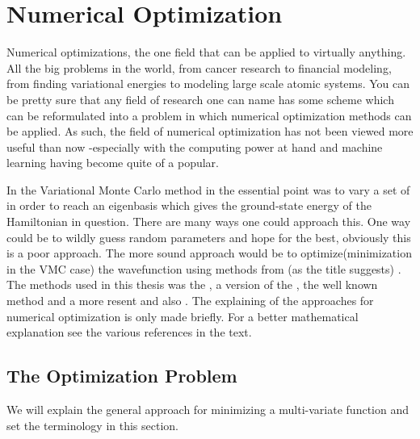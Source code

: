 \chapter{Numerical Optimization \label{chapter:4}}
    Numerical optimizations, the one field that can be applied to virtually
    anything. All the big problems in the world, from cancer research to
    financial modeling, from finding variational energies to modeling large
    scale atomic systems. You can be pretty sure that any field of research one
    can name has some scheme which can be reformulated into a problem in which
    numerical optimization methods can be applied. As such, the field of
    numerical optimization has not been viewed more useful than now -especially
    with the computing power at hand and machine learning having become quite
    of a popular. 

    In the Variational Monte Carlo method in  the essential point
    was to vary a set of  in order to reach an
    eigenbasis which gives the ground-state energy of the Hamiltonian in
    question. There are many ways one could approach this. One way could be to
    wildly guess random parameters and hope for the best, obviously this is a
    poor approach. The more sound approach would be to optimize(minimization in
    the VMC case) the wavefunction using methods from (as the title suggests)
    . The methods used in this thesis was the
    , a version of the , the well known  method and a more
    resent  and also . The explaining of the approaches for numerical optimization is
    only made briefly. For a better mathematical explanation see the various
    references in the text.

\section{The Optimization Problem \label{sec:the_optimization_problem}}
    We will explain the general approach for minimizing a multi-variate
    function and set the terminology in this section. \\

